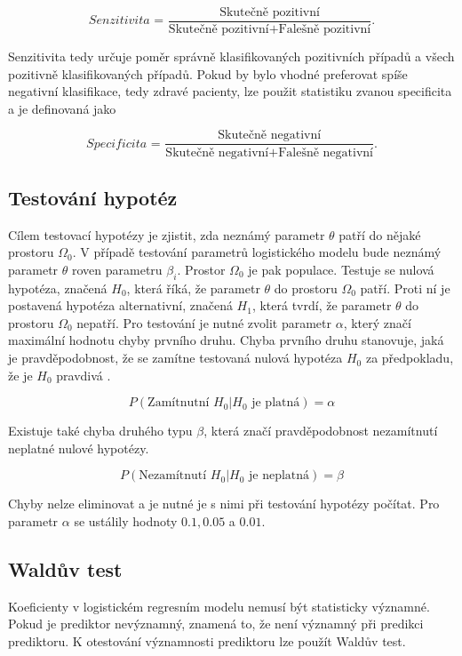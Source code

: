 \begin{equation*}
    \textit{Senzitivita = } \frac{\text{Skutečně pozitivní}}{\text{Skutečně pozitivní} + \text{Falešně pozitivní}}.
\end{equation*}

Senzitivita tedy určuje poměr správně klasifikovaných pozitivních případů a všech pozitivně klasifikovaných případů. Pokud by bylo vhodné preferovat
spíše negativní klasifikace, tedy zdravé pacienty, lze použit statistiku zvanou specificita a je definovaná jako

\begin{equation*}
    \textit{Specificita = } \frac{\text{Skutečně negativní}}{\text{Skutečně negativní} + \text{Falešně negativní}}.
\end{equation*}

\subsection{Testování hypotéz}
Cílem testovací hypotézy je zjistit, zda neznámý parametr $\theta$ patří do nějaké prostoru $\Omega_0$. V případě testování parametrů logistického modelu bude
neznámý parametr $\theta$ roven parametru $\beta_i$. Prostor $\Omega_0$ je pak populace. Testuje se nulová hypotéza, značená $H_0$, která říká, že
parametr $\theta$ do prostoru $\Omega_0$ patří. Proti ní je postavená hypotéza alternativní, značená $H_1$, která tvrdí, že parametr $\theta$ do prostoru
$\Omega_0$ nepatří. Pro testování je nutné zvolit parametr $\alpha$, který značí maximální hodnotu chyby prvního druhu. Chyba prvního druhu stanovuje, jaká je 
pravděpodobnost, že se zamítne testovaná nulová hypotéza $H_0$ za předpokladu, že je $H_0$ pravdivá \cite{hardle_applied_2015}.

\begin{equation*}
    P(\text{Zamítnutní }H_0 | H_0\text{ je platná}) = \alpha
\end{equation*}

Existuje také chyba druhého typu $\beta$, která značí pravděpodobnost nezamítnutí neplatné nulové hypotézy.

\begin{equation*}
    P(\text{Nezamítnutí }H_0 | H_0\text{ je neplatná}) = \beta
\end{equation*}

Chyby nelze eliminovat a je nutné je s nimi při testování hypotézy počítat. Pro parametr $\alpha$ se ustálily hodnoty $0.1, 0.05$ a $0.01$.


\subsection{Waldův test}
Koeficienty v logistickém regresním modelu nemusí být statisticky významné. Pokud je prediktor nevýznamný, znamená to, že není významný při predikci prediktoru.
K otestování významnosti prediktoru lze použít Waldův test.

